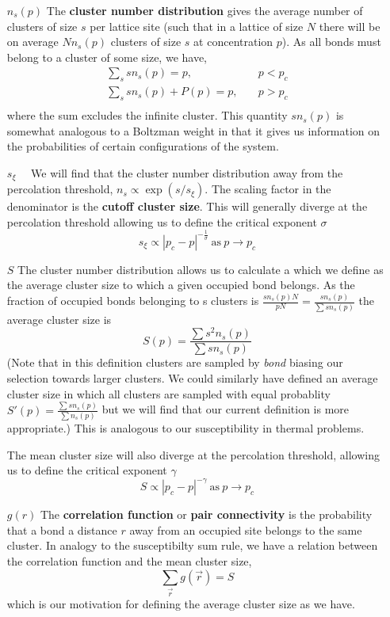 \begin{enumerate}
\item[$n_s(p)$] The \textbf{cluster number distribution} gives the average number of
clusters of size $s$ per lattice site (such that in a lattice of size $N$ there will be on
average $Nn_s(p)$ clusters of size $s$ at concentration $p$).  As all bonds must belong
to a cluster of some size, we have,
\begin{align*}
\sum_s sn_s(p) = p,&\quad p<p_c \\
\sum_s sn_s(p)+ P(p) = p,&\quad p>p_c \\
\end{align*}
 where the sum excludes the infinite cluster. This
quantity $sn_s(p)$ is somewhat
analogous to a Boltzman weight in that it gives us information on the probabilities of
certain configurations of the system.

\item[$s_\xi\quad$] We will find that the cluster number
distribution away from the percolation threshold, $n_s \propto \exp{(s/s_\xi)}$.
The scaling factor in the denominator is the \textbf{cutoff cluster size}.  This will
generally diverge at the percolation threshold allowing us to define the critical exponent
$\sigma$
\[ s_\xi \propto |p_c - p|^{-\frac{1}{\sigma}} \ \text{as}\ p\to p_c \]

\item[$S$\quad] The cluster number distribution allows us to calculate a  which we define as the average cluster size to which a given occupied bond belongs.
As the fraction of occupied bonds belonging to s clusters is
\(\frac{sn_s(p)N}{pN} = \frac{sn_s(p)}{\sum sn_s(p)}\) the average cluster size is
\[S(p) = \frac{\sum s^2 n_s(p)}{\sum s n_s(p)}\]
(Note that in this definition clusters are sampled by \emph{bond} biasing our selection
towards larger clusters.  We could similarly have defined an average cluster size in which
all clusters are sampled with equal probablity
\(S'(p) = \frac{\sum s n_s(p)}{\sum  n_s(p)}\) but we will find that our current definition
is more appropriate.) This is analogous to our susceptibility in thermal problems.

The mean cluster size will also diverge at the percolation threshold, allowing us to
define the critical exponent $\gamma$
\[ S \propto |p_c - p|^{-\gamma} \ \text{as}\ p\to p_c \]

\item[$g(r)$] The \textbf{correlation function} or \textbf{pair connectivity} is the
probability that a bond a distance $r$ away from an occupied site belongs to the same
cluster.  In analogy to the susceptibilty sum rule, we have a relation between the
correlation function and the mean cluster size,
\[\sum_{\vec{r}} g(\vec{r}) = S\]
which is our motivation for defining the average cluster size as we have.


\end{enumerate}
